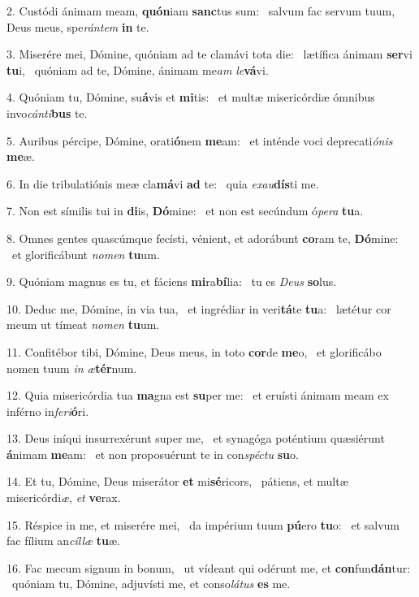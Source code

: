 2. Custódi ánimam meam, \textbf{quón}iam \textbf{sanc}tus sum: \ast\  salvum fac servum tuum, Deus meus, spe\textit{rán}\textit{tem} \textbf{in} te.\

3. Miserére mei, Dómine, quóniam ad te clamávi tota die: \dag\  lætífica ánimam \textbf{ser}vi \textbf{tu}i, \ast\  quóniam ad te, Dómine, ánimam me\textit{am} \textit{le}\textbf{vá}vi.\

4. Quóniam tu, Dómine, su\textbf{á}vis et \textbf{mi}tis: \ast\  et multæ misericórdiæ ómnibus invo\textit{cán}\textit{ti}\textbf{bus} te.\

5. Auribus pércipe, Dómine, orati\textbf{ó}nem \textbf{me}am: \ast\  et inténde voci deprecati\textit{ó}\textit{nis} \textbf{me}æ.\

6. In die tribulatiónis meæ cla\textbf{má}vi \textbf{ad} te: \ast\  quia \textit{ex}\textit{au}\textbf{dís}ti me.\

7. Non est símilis tui in \textbf{di}is, \textbf{Dó}mine: \ast\  et non est secúndum ó\textit{pe}\textit{ra} \textbf{tu}a.\

8. Omnes gentes quascúmque fecísti, vénient, et adorábunt \textbf{co}ram te, \textbf{Dó}mine: \ast\  et glorificábunt \textit{no}\textit{men} \textbf{tu}um.\

9. Quóniam magnus es tu, et fáciens \textbf{mi}ra\textbf{bí}lia: \ast\  tu es \textit{De}\textit{us} \textbf{so}lus.\

10. Deduc me, Dómine, in via tua, \dag\  et ingrédiar in veri\textbf{tá}te \textbf{tu}a: \ast\  lætétur cor meum ut tímeat \textit{no}\textit{men} \textbf{tu}um.\

11. Confitébor tibi, Dómine, Deus meus, in toto \textbf{cor}de \textbf{me}o, \ast\  et glorificábo nomen tuum \textit{in} \textit{æ}\textbf{tér}num.\

12. Quia misericórdia tua \textbf{ma}gna est \textbf{su}per me: \ast\  et eruísti ánimam meam ex inférno in\textit{fe}\textit{ri}\textbf{ó}ri.\

13. Deus iníqui insurrexérunt super me, \dag\  et synagóga poténtium quæsiérunt \textbf{á}nimam \textbf{me}am: \ast\  et non proposuérunt te in con\textit{spéc}\textit{tu} \textbf{su}o.\

14. Et tu, Dómine, Deus miserátor \textbf{et} mi\textbf{sé}ricors, \ast\  pátiens, et multæ misericórdi\textit{æ}, \textit{et} \textbf{ve}rax.\

15. Réspice in me, et miserére mei, \dag\  da impérium tuum \textbf{pú}ero \textbf{tu}o: \ast\  et salvum fac fílium an\textit{cíl}\textit{læ} \textbf{tu}æ.\

16. Fac mecum signum in bonum, \dag\  ut vídeant qui odérunt me, et \textbf{con}fun\textbf{dán}tur: \ast\  quóniam tu, Dómine, adjuvísti me, et conso\textit{lá}\textit{tus} \textbf{es} me.\

